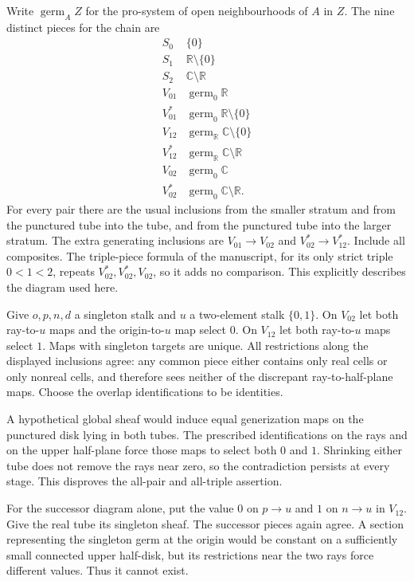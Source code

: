 \documentclass[11pt,a4paper]{article}
\theoremstyle{definition}
\newcommand{\R}{\mathbb R}
\newcommand{\C}{\mathbb C}
\begin{document}
Write $\operatorname{germ}_A Z$ for the pro-system of open neighbourhoods of $A$ in $Z$. The nine distinct pieces for the chain are
\[
\begin{array}{c|l}
 S_0&\{0\}\\
 S_1&\R\setminus\{0\}\\
 S_2&\C\setminus\R\\
 V_{01}&\operatorname{germ}_0\R\\
 V_{01}^*&\operatorname{germ}_0\R\setminus\{0\}\\
 V_{12}&\operatorname{germ}_{\R}\C\setminus\{0\}\\
 V_{12}^*&\operatorname{germ}_{\R}\C\setminus\R\\
 V_{02}&\operatorname{germ}_0\C\\
 V_{02}^*&\operatorname{germ}_0\C\setminus\R.
\end{array}
\]
For every pair there are the usual inclusions from the smaller stratum and from the punctured tube into the tube, and from the punctured tube into the larger stratum. The extra generating inclusions are $V_{01}\to V_{02}$ and $V_{02}^*\to V_{12}^*$. Include all composites. The triple-piece formula of the manuscript, for its only strict triple $0<1<2$, repeats $V_{02}^*,V_{02}^*,V_{02}$, so it adds no comparison. This explicitly describes the diagram used here.

Give $o,p,n,d$ a singleton stalk and $u$ a two-element stalk $\{0,1\}$. On $V_{02}$ let both ray-to-$u$ maps and the origin-to-$u$ map select $0$. On $V_{12}$ let both ray-to-$u$ maps select $1$. Maps with singleton targets are unique. All restrictions along the displayed inclusions agree: any common piece either contains only real cells or only nonreal cells, and therefore sees neither of the discrepant ray-to-half-plane maps. Choose the overlap identifications to be identities.

A hypothetical global sheaf would induce equal generization maps on the punctured disk lying in both tubes. The prescribed identifications on the rays and on the upper half-plane force those maps to select both $0$ and $1$. Shrinking either tube does not remove the rays near zero, so the contradiction persists at every stage. This disproves the all-pair and all-triple assertion.

For the successor diagram alone, put the value $0$ on $p\to u$ and $1$ on $n\to u$ in $V_{12}$. Give the real tube its singleton sheaf. The successor pieces again agree. A section representing the singleton germ at the origin would be constant on a sufficiently small connected upper half-disk, but its restrictions near the two rays force different values. Thus it cannot exist.
\end{document}

